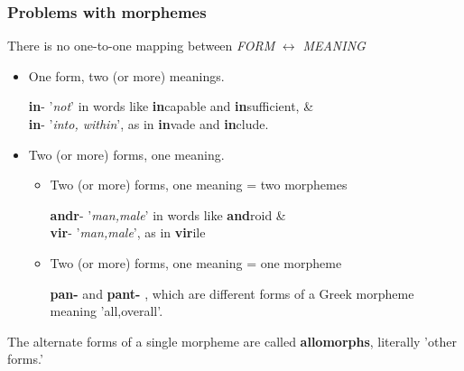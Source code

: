 \documentclass[12pt]{article}
\begin{document}
\subsubsection{Problems with morphemes}
There is no one-to-one mapping between \textit{FORM} $\leftrightarrow$ \textit{MEANING}
\begin{itemize}
\item One form, two (or more) meanings.
	\begin{addmargin}[3em]{2em}%
	\color{red}\textbf{in}- \color{blue}'\textit{not}' \color{black}in words like \color{red}\textbf{in}\color{black}capable and \color{red}\textbf{in}\color{black}sufficient, \& \\
	\color{red}\textbf{in}- \color{blue}'\textit{into, within}', \color{black}as in \color{red}\textbf{in}\color{black}vade and \color{red}\textbf{in}\color{black}clude.
	\end{addmargin}

\item Two (or more) forms, one meaning.
\begin{itemize}
\item Two (or more) forms, one meaning = two morphemes
	\begin{addmargin}[3em]{2em}%
	\color{red}\textbf{andr}- \color{blue}'\textit{man,male}' \color{black}in words like \color{red}\textbf{and}\color{black}roid \& \\
	\color{red}\textbf{vir}- \color{blue}'\textit{man,male}', \color{black}as in \color{red}\textbf{vir}\color{black}ile
	\end{addmargin}

\item Two (or more) forms, one meaning = one morpheme
	\begin{addmargin}[3em]{2em}%
		\color{red} \textbf{pan-} \color{black} and \color{red} \textbf{pant-} \color{black}, which are different forms of a Greek morpheme meaning \color{blue}'all,overall'. 
	\end{addmargin}

\end{itemize}
\end{itemize}
The alternate forms of a single morpheme are called \color{blue}\textbf{allomorphs},\color{black} literally 'other forms.' 
\end{document}
